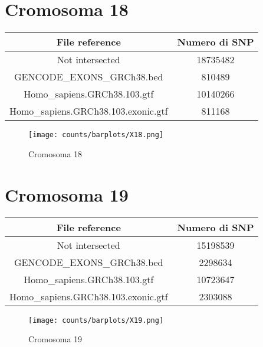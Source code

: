 \section*{Cromosoma 18}
  \begin{table}[H]\centering
	\begin{tabular}{|c|c|}
	  \hline
	  File reference & Numero di SNP \\
		\hline
		Not intersected & 18735482 \\
	  \hline
	  GENCODE\_EXONS\_GRCh38.bed & 810489 \\
	  \hline
	  Homo\_sapiens.GRCh38.103.gtf & 10140266 \\
	  \hline
	  Homo\_sapiens.GRCh38.103.exonic.gtf & 811168 \\
	  \hline
	\end{tabular}
  \end{table}
  \begin{figure}[H]
	\texttt{[image: counts/barplots/X18.png]}
	\caption{Cromosoma 18}
	\label{fig:chr18}
  \end{figure}

\section*{Cromosoma 19}
  \begin{table}[H]\centering
	\begin{tabular}{|c|c|}
	  \hline
	  File reference & Numero di SNP \\
		\hline
		Not intersected & 15198539 \\
	  \hline
	  GENCODE\_EXONS\_GRCh38.bed & 2298634 \\
	  \hline
	  Homo\_sapiens.GRCh38.103.gtf & 10723647 \\
	  \hline
	  Homo\_sapiens.GRCh38.103.exonic.gtf & 2303088 \\
	  \hline
	\end{tabular}
  \end{table}
  \begin{figure}[H]
	\texttt{[image: counts/barplots/X19.png]}
	\caption{Cromosoma 19}
	\label{fig:chr19}
  \end{figure}

